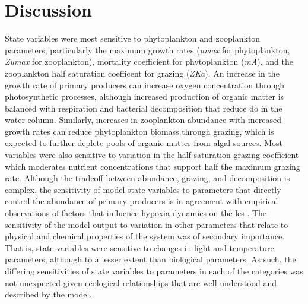 \documentclass[review]{elsarticle}\usepackage[]{graphicx}\usepackage[]{color}
\begin{document}
\section{Discussion}

State variables were most sensitive to phytoplankton and zooplankton parameters, particularly the maximum growth rates (\textit{umax} for phytoplankton, \textit{Zumax} for zooplankton), mortality coefficient for phytoplankton (\textit{mA}), and the zooplankton half saturation coefficent for grazing (\textit{ZKa}). An increase in the growth rate of primary producers can increase oxygen concentration through photosynthetic processes, although increased production of organic matter is balanced with respiration and bacterial decomposition that reduce \ac{do} in the water column.  Similarly, increases in zooplankton abundance with increased growth rates can reduce phytoplankton biomass through grazing, which is expected to further deplete pools of organic matter from algal sources.  Most variables were also sensitive to variation in the half-saturation grazing coefficient which moderates nutrient concentrations that support half the maximum grazing rate. Although the tradeoff between abundance, grazing, and decomposition is complex, the sensitivity of model state variables to parameters that directly control the abundance of primary producers is in agreement with empirical observations of factors that influence hypoxia dynamics on the \ac{lcs} \citep{Fahnenstiel95,Roelke00,Eldridge10}. The sensitivity of the model output to variation in other parameters that relate to physical and chemical properties of the system was of secondary importance.  That is, state variables were sensitive to changes in light and temperature parameters, although to a lesser extent than biological parameters.  As such, the differing sensitivities of state variables to parameters in each of the categories was not unexpected given ecological relationships that are well understood and described by the model.    
\end{document}
